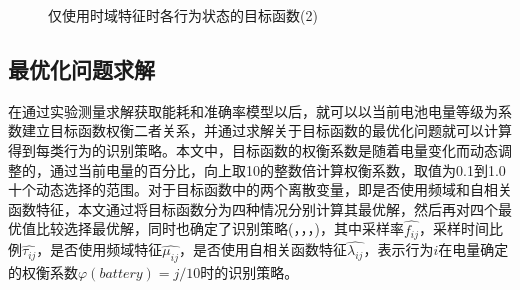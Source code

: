\begin{figure}[htb]
    \centering
    \caption{仅使用时域特征时各行为状态的目标函数(2)}\label{object_function2}
\end{figure}
\subsection{最优化问题求解}
\par 在通过实验测量求解获取能耗和准确率模型以后，就可以以当前电池电量等级为系数建立目标函数权衡二者关系，并通过求解关于目标函数的最优化问题就可以计算得到每类行为的识别策略。本文中，目标函数的权衡系数是随着电量变化而动态调整的，通过当前电量的百分比，向上取10的整数倍计算权衡系数，取值为0.1到1.0十个动态选择的范围。对于目标函数中的两个离散变量，即是否使用频域和自相关函数特征，本文通过将目标函数分为四种情况分别计算其最优解，然后再对四个最优值比较选择最优解，同时也确定了识别策略(，\bm{$\widehat{\tau}$}，\bm{$\widehat{\mu}$}，\bm{$\widehat{\lambda}$})，其中采样率$\widehat{f_{ij}}$，采样时间比例$\widehat{\tau_{ij}}$，是否使用频域特征$\widehat{\mu_{ij}}$，是否使用自相关函数特征$\widehat{\lambda_{ij}}$，表示行为$i$在电量确定的权衡系数$\varphi (battery) = j/10$时的识别策略。

